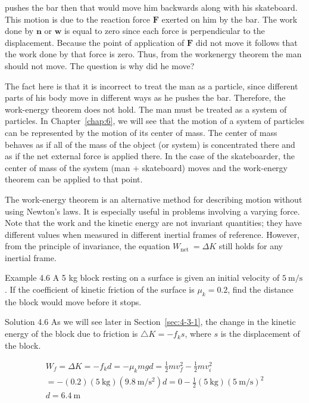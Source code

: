 \documentclass[10pt]{article}
\numberwithin{equation}{section}
\begin{document}
pushes the bar then that would move him backwards along with his skateboard. This motion is due to the reaction force $\mathbf{F}$ exerted on him by the bar. The work done by $\mathbf{n}$ or $\mathbf{w}$ is equal to zero since each force is perpendicular to the displacement. Because the point of application of $\mathbf{F}$ did not move it follows that the work done by that force is zero. Thus, from the workenergy theorem the man should not move. The question is why did he move?

The fact here is that it is incorrect to treat the man as a particle, since different parts of his body move in different ways as he pushes the bar. Therefore, the work-energy theorem does not hold. The man must be treated as a system of particles. In Chapter~\ref{chap:6}, we will see that the motion of a system of particles can be represented by the motion of its center of mass. The center of mass behaves as if all of the mass of the object (or system) is concentrated there and as if the net external force is applied there. In the case of the skateboarder, the center of mass of the system (man + skateboard) moves and the work-energy theorem can be applied to that point.

The work-energy theorem is an alternative method for describing motion without using Newton's laws. It is especially useful in problems involving a varying force. Note that the work and the kinetic energy are not invariant quantities; they have different values when measured in different inertial frames of reference. However, from the principle of invariance, the equation $W_{\text {net }}=\Delta K$ still holds for any inertial frame.

Example 4.6 A 5 kg block resting on a surface is given an initial velocity of $5 \mathrm{~m} / \mathrm{s}$. If the coefficient of kinetic friction of the surface is $\mu_{k}=0.2$, find the distance the block would move before it stops.

Solution 4.6 As we will see later in Section~\ref{sec:4-3-1}, the change in the kinetic energy of the block due to friction is $\triangle K=-f_{k} s$, where $s$ is the displacement of the block.

$$
\begin{gathered}
W_{f}=\Delta K=-f_{k} d=-\mu_{k} m g d=\frac{1}{2} m v_{f}^{2}-\frac{1}{2} m v_{i}^{2} \\
=-(0.2)(5 \mathrm{~kg})\left(9.8 \mathrm{~m} / \mathrm{s}^{2}\right) d=0-\frac{1}{2}(5 \mathrm{~kg})(5 \mathrm{~m} / \mathrm{s})^{2} \\
d=6.4 \mathrm{~m}
\end{gathered}
$$
\end{document}
